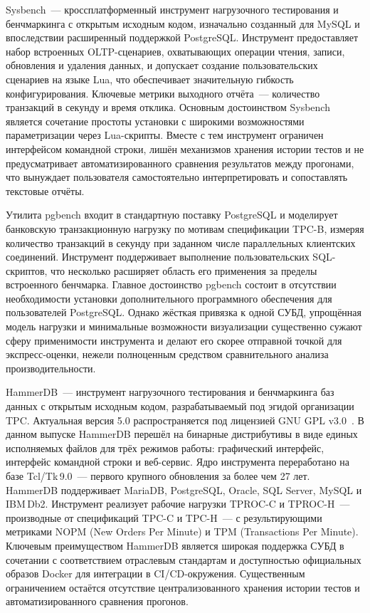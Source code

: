 Sysbench~--- кроссплатформенный инструмент нагрузочного тестирования и бенчмаркинга с открытым исходным кодом, изначально созданный для MySQL и впоследствии расширенный поддержкой PostgreSQL. Инструмент предоставляет набор встроенных OLTP-сценариев, охватывающих операции чтения, записи, обновления и удаления данных, и допускает создание пользовательских сценариев на языке Lua, что обеспечивает значительную гибкость конфигурирования. Ключевые метрики выходного отчёта~--- количество транзакций в секунду и время отклика. Основным достоинством Sysbench является сочетание простоты установки с широкими возможностями параметризации через Lua-скрипты. Вместе с тем инструмент ограничен интерфейсом командной строки, лишён механизмов хранения истории тестов и не предусматривает автоматизированного сравнения результатов между прогонами, что вынуждает пользователя самостоятельно интерпретировать и сопоставлять текстовые отчёты.

Утилита pgbench входит в стандартную поставку PostgreSQL и моделирует банковскую транзакционную нагрузку по мотивам спецификации TPC-B, измеряя количество транзакций в секунду при заданном числе параллельных клиентских соединений. Инструмент поддерживает выполнение пользовательских SQL-скриптов, что несколько расширяет область его применения за пределы встроенного бенчмарка. Главное достоинство pgbench состоит в отсутствии необходимости установки дополнительного программного обеспечения для пользователей PostgreSQL. Однако жёсткая привязка к одной СУБД, упрощённая модель нагрузки и минимальные возможности визуализации существенно сужают сферу применимости инструмента и делают его скорее отправной точкой для экспресс-оценки, нежели полноценным средством сравнительного анализа производительности.

HammerDB~--- инструмент нагрузочного тестирования и бенчмаркинга баз данных с открытым исходным кодом, разрабатываемый под эгидой организации TPC. Актуальная версия 5.0 распространяется под лицензией GNU GPL v3.0~\cite{hammerdb_v5}. В данном выпуске HammerDB перешёл на бинарные дистрибутивы в виде единых исполняемых файлов для трёх режимов работы: графический интерфейс, интерфейс командной строки и веб-сервис. Ядро инструмента переработано на базе Tcl/Tk\,9.0~--- первого крупного обновления за более чем 27 лет. HammerDB поддерживает MariaDB, PostgreSQL, Oracle, SQL Server, MySQL и IBM\,Db2. Инструмент реализует рабочие нагрузки TPROC-C и TPROC-H~--- производные от спецификаций TPC-C и TPC-H~--- с результирующими метриками NOPM (New Orders Per Minute) и TPM (Transactions Per Minute). Ключевым преимуществом HammerDB является широкая поддержка СУБД в сочетании с соответствием отраслевым стандартам и доступностью официальных образов Docker для интеграции в CI/CD-окружения. Существенным ограничением остаётся отсутствие централизованного хранения истории тестов и автоматизированного сравнения прогонов.

